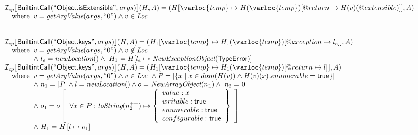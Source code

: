 \[\begin{array}{l}
\I _{cp}\lbr \SF{BuiltintCall}(``\SF{Object.isExtensible}",args)\rbr(H,A)
 = (H[\varloc{temp}\mapsto H(\varloc{temp})[\varprop{return}\mapsto H(v)(@extensible)]], A) \\
\quad\wherec{
  v = \hf{getArgValue}(args, ``0") \land v  \in\Loc}\\
\\\\

\I _{cp}\lbr \SF{BuiltintCall}(``\SF{Object.keys}",args)\rbr(H,A)
 = (H_1[\varloc{temp}\mapsto H_1(\varloc{temp})[\varprop{exception}\mapsto l_{e}]], A) \\
\quad\wherec{
  v = \hf{getArgValue}(args, ``0") \land v\not\in\Loc\\
  \land\ l_e = \hf{newLocation}() \land\ H_1=H[l_e\mapsto\hf{NewExceptionObject}(\SF{TypeError})] }\\

\I _{cp}\lbr \SF{BuiltintCall}(``\SF{Object.keys}",args)\rbr(H,A)
 = (H_1[\varloc{temp}\mapsto H_1(\varloc{temp})[\varprop{return}\mapsto l ]], A) \\
\quad\wherec{
  v = \hf{getArgValue}(args, ``0") \land v  \in\Loc\
  \land P = |\{x \mid  x\in dom(H(v)) \land H(v)(x).enumerable = \SF{true} \} |\\
  \land\ n_1 = |P| \land l=\hf{newLocation}() \land o=\hf{NewArrayObject}(n_1) \land\ n_2 = 0\\
  \land\ o_1 = o\left[
    \begin{array}{l}
      \forall x \in P: 
      \hf{toString}(n_2^{++}) \mapsto \left\{
        \begin{array}{l}
          value: x\\
          writable: \SF{true} \\
          enumerable: \SF{true}\\
          configurable: \SF{true} \\
        \end{array}
        \right\}\\
    \end{array}\right]\\
    \land\ H_1 = H\left[l\mapsto o_1\right]
   }\\
\\\\

\end{array}
\]

